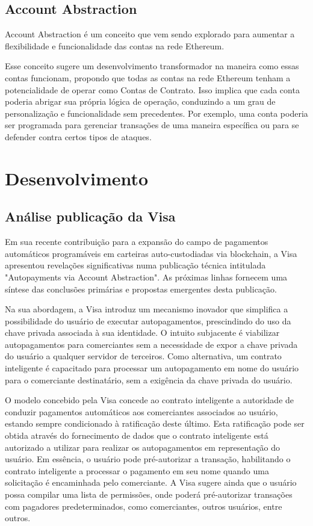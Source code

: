 \documentclass[12pt]{article}
\begin{document}
\subsection{Account Abstraction}
Account Abstraction é um conceito que vem sendo explorado para aumentar a flexibilidade e
funcionalidade das contas na rede Ethereum.

Esse conceito sugere um desenvolvimento transformador na maneira como essas contas funcionam,
propondo que todas as contas na rede Ethereum tenham a potencialidade de operar como Contas de
Contrato. Isso implica que cada conta poderia abrigar sua própria lógica de operação, conduzindo a
um grau de personalização e funcionalidade sem precedentes. Por exemplo, uma conta poderia ser
programada para gerenciar transações de uma maneira específica ou para se defender contra certos
tipos de ataques.

\section{Desenvolvimento}\label{sec:desenvolvimento}
\subsection{Análise publicação da Visa}
Em sua recente contribuição para a expansão do campo de pagamentos automáticos programáveis em
carteiras auto-custodiadas via blockchain, a Visa apresentou revelações significativas numa
publicação técnica intitulada "Autopayments via Account Abstraction". As próximas linhas fornecem
uma síntese das conclusões primárias e propostas emergentes desta publicação.

Na sua abordagem, a Visa introduz um mecanismo inovador que simplifica a possibilidade do usuário
de executar autopagamentos, prescindindo do uso da chave privada associada à sua identidade. O
intuito subjacente é viabilizar autopagamentos para comerciantes sem a necessidade de expor a chave
privada do usuário a qualquer servidor de terceiros. Como alternativa, um contrato inteligente é
capacitado para processar um autopagamento em nome do usuário para o comerciante destinatário, sem
a exigência da chave privada do usuário.

O modelo concebido pela Visa concede ao contrato inteligente a autoridade de conduzir pagamentos
automáticos aos comerciantes associados ao usuário, estando sempre condicionado à ratificação deste
último. Esta ratificação pode ser obtida através do fornecimento de dados que o contrato
inteligente está autorizado a utilizar para realizar os autopagamentos em representação do usuário.
Em essência, o usuário pode pré-autorizar a transação, habilitando o contrato inteligente a
processar o pagamento em seu nome quando uma solicitação é encaminhada pelo comerciante. A Visa
sugere ainda que o usuário possa compilar uma lista de permissões, onde poderá pré-autorizar
transações com pagadores predeterminados, como comerciantes, outros usuários, entre outros.
\end{document}
